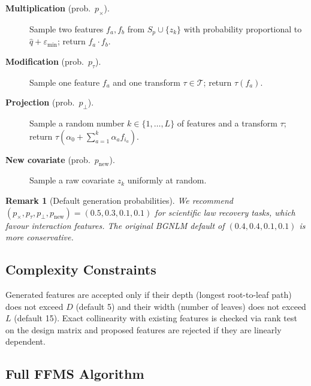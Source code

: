 \documentclass[12pt,a4paper]{article}
\newtheorem{remark}{Remark}
\begin{document}
\begin{description}
  \item[\textbf{Multiplication} (prob.\ $p_\times$).]
    Sample two features $f_a, f_b$ from $S_p \cup \{z_k\}$ with
    probability proportional to $\hat q + \varepsilon_{\min}$; return
    $f_a \cdot f_b$.
  \item[\textbf{Modification} (prob.\ $p_\tau$).]
    Sample one feature $f_a$ and one transform $\tau \in \mathcal{T}$;
    return $\tau(f_a)$.
  \item[\textbf{Projection} (prob.\ $p_\perp$).]
    Sample a random number $k \in \{1,\ldots,L\}$ of features and a
    transform $\tau$; return
    $\tau\!\left(\alpha_0 + \sum_{a=1}^k \alpha_a f_{i_a}\right)$.
  \item[\textbf{New covariate} (prob.\ $p_{\text{new}}$).]
    Sample a raw covariate $z_k$ uniformly at random.
\end{description}

\begin{remark}[Default generation probabilities]
  We recommend $(p_\times, p_\tau, p_\perp, p_{\text{new}}) = (0.5, 0.3,
  0.1, 0.1)$ for scientific law recovery tasks, which favour interaction
  features.  The original BGNLM default of $(0.4,0.4,0.1,0.1)$ is more
  conservative.
\end{remark}

\subsection{Complexity Constraints}

Generated features are accepted only if their depth (longest root-to-leaf path)
does not exceed $D$ (default 5) and their width (number of leaves) does not
exceed $L$ (default 15).  Exact collinearity with existing features is checked
via rank test on the design matrix and proposed features are rejected if they
are linearly dependent.

\subsection{Full FFMS Algorithm}
\end{document}
